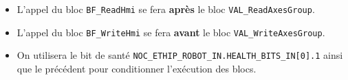 \begin{UPSTIManipulation}
    \begin{itemize}
        \item L'appel du bloc \texttt{BF\_ReadHmi} se fera \textbf{après} le bloc \texttt{VAL\_ReadAxesGroup}.
        \item L'appel du bloc \texttt{BF\_WriteHmi} se fera \textbf{avant} le bloc \texttt{VAL\_WriteAxesGroup}.
        \item On utilisera le bit de santé \texttt{NOC\_ETHIP\_ROBOT\_IN.HEALTH\_BITS\_IN[0].1} ainsi que le précédent pour conditionner l'exécution des blocs.
    \end{itemize}
\end{UPSTIManipulation}

\begin{UPSTIVerification}
\end{UPSTIVerification}

